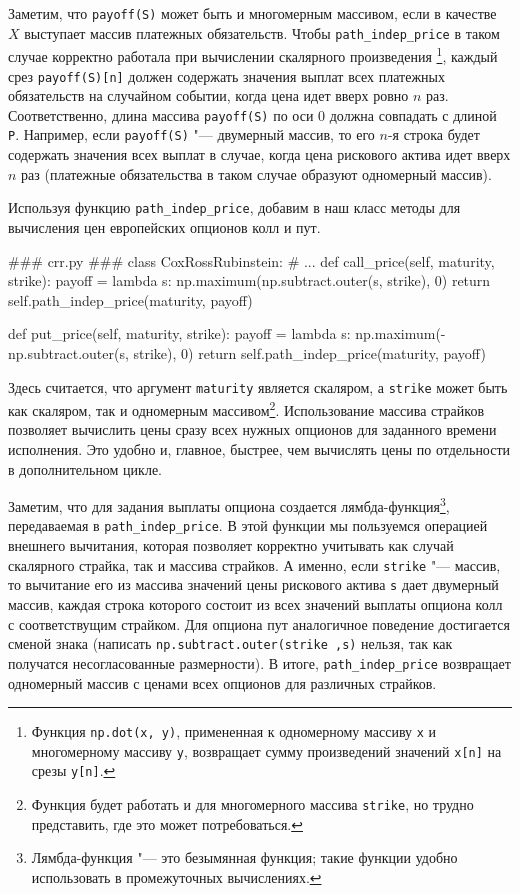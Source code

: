 Заметим, что \verb"payoff(S)" может быть и многомерным массивом, если в качестве $X$ выступает массив платежных обязательств.
Чтобы \verb"path_indep_price" в таком случае корректно работала при вычислении скалярного произведения%
\footnote{Функция \verb"np.dot(x, y)", примененная к одномерному массиву \verb"x" и многомерному массиву \verb"y", возвращает сумму произведений значений \verb"x[n]" на срезы \verb"y[n]".},
каждый срез \verb"payoff(S)[n]" должен содержать значения выплат всех платежных обязательств на случайном событии, когда цена идет вверх ровно $n$ раз. Соответственно, длина массива \verb"payoff(S)" по оси 0 должна совпадать с длиной \verb"P".
Например, если \verb"payoff(S)" "--- двумерный массив, то его $n$-я строка будет содержать значения всех выплат в случае, когда цена рискового актива идет вверх $n$ раз (платежные обязательства в таком случае образуют одномерный массив).

Используя функцию \verb"path_indep_price", добавим в наш класс методы для вычисления цен европейских опционов колл и пут.
\begin{python}
### crr.py ###
class CoxRossRubinstein:
    # ...
    def call_price(self, maturity, strike):
        payoff = lambda s: np.maximum(np.subtract.outer(s, strike), 0)
        return self.path_indep_price(maturity, payoff)
    
    def put_price(self, maturity, strike):
        payoff = lambda s: np.maximum(-np.subtract.outer(s, strike), 0)
        return self.path_indep_price(maturity, payoff)
\end{python}
Здесь считается, что аргумент \verb"maturity" является скаляром, а \verb"strike" может быть как скаляром, так и одномерным массивом\footnote{Функция будет работать и для многомерного массива \verb"strike", но трудно представить, где это может потребоваться.}.
Использование массива страйков позволяет вычислить цены сразу всех нужных опционов для заданного времени исполнения.
Это удобно и, главное, быстрее, чем вычислять цены по отдельности в дополнительном цикле.

Заметим, что для задания выплаты опциона создается лямбда-функция\footnote{Лямбда-функция "--- это безымянная функция; такие функции удобно использовать в промежуточных вычислениях.}, передаваемая в \verb"path_indep_price".
В этой функции мы пользуемся операцией внешнего вычитания, которая позволяет корректно учитывать как случай скалярного страйка, так и массива страйков.
А именно, если \verb"strike" "--- массив, то вычитание его из массива значений цены рискового актива \verb"s" дает двумерный массив, каждая строка которого состоит из всех значений выплаты опциона колл с соответствущим страйком.
Для опциона пут аналогичное поведение достигается сменой знака (написать \verb"np.subtract.outer(strike ,s)" нельзя, так как получатся несогласованные размерности).
В итоге, \verb"path_indep_price" возвращает одномерный массив с ценами всех опционов для различных страйков.


